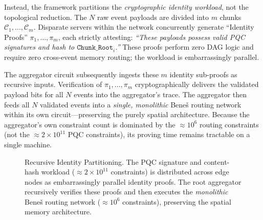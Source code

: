 \documentclass[11pt,a4paper]{article}
\begin{document}
Instead, the framework partitions the \emph{cryptographic identity
workload}, not the topological reduction.  The $N$ raw event
payloads are divided into $m$ chunks
$\mathcal{C}_1, \dots, \mathcal{C}_m$.  Disparate servers within the
network concurrently generate ``Identity Proofs''
$\pi_1, \dots, \pi_m$, each strictly attesting: \emph{``These
payloads possess valid PQC signatures and hash to
$\texttt{Chunk\_Root}_i$.''}  These proofs perform zero DAG logic
and require zero cross-event memory routing; the workload is
embarrassingly parallel.

The aggregator circuit subsequently ingests these $m$ identity
sub-proofs as recursive inputs.  Verification of $\pi_1, \dots,
\pi_m$ cryptographically delivers the validated payload bits for all
$N$ events into the aggregator's trace.  The aggregator then feeds
all $N$ validated events into a \emph{single, monolithic}
Bene\v{s} routing network within its own circuit---preserving the
purely spatial architecture.  Because the aggregator's own constraint
count is dominated by the $\approx 10^6$ routing constraints (not
the $\approx 2 \times 10^{11}$ PQC constraints), its proving time
remains tractable on a single machine.

\begin{figure}[h]
    \centering
    \footnotesize
    \caption{Recursive Identity Partitioning.  The PQC signature and
    content-hash workload ($\approx 2 \times 10^{11}$ constraints) is
    distributed across edge nodes as embarrassingly parallel identity
    proofs.  The root aggregator recursively verifies these proofs and
    then executes the \emph{monolithic} Bene\v{s} routing network
    ($\approx 10^6$ constraints), preserving the spatial memory
    architecture.}
    \label{fig:recursive_mapreduce}
\end{figure}
\end{document}
